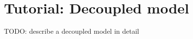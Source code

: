 \chapter[Tutorial: Decoupled model]{Tutorial: Decoupled model}

TODO: describe a decoupled model in detail
